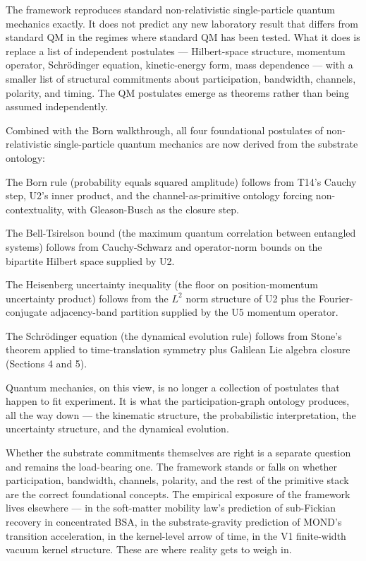 \documentclass[11pt,a4paper]{article}
\begin{document}
The framework reproduces standard non-relativistic single-particle quantum mechanics exactly. It does not predict any new laboratory result that differs from standard QM in the regimes where standard QM has been tested. What it does is replace a list of independent postulates --- Hilbert-space structure, momentum operator, Schr\"odinger equation, kinetic-energy form, mass dependence --- with a smaller list of structural commitments about participation, bandwidth, channels, polarity, and timing. The QM postulates emerge as theorems rather than being assumed independently.

Combined with the Born walkthrough, all four foundational postulates of non-relativistic single-particle quantum mechanics are now derived from the substrate ontology:

The Born rule (probability equals squared amplitude) follows from T14's Cauchy step, U2's inner product, and the channel-as-primitive ontology forcing non-contextuality, with Gleason-Busch as the closure step.

The Bell-Tsirelson bound (the maximum quantum correlation between entangled systems) follows from Cauchy-Schwarz and operator-norm bounds on the bipartite Hilbert space supplied by U2.

The Heisenberg uncertainty inequality (the floor on position-momentum uncertainty product) follows from the $L^2$ norm structure of U2 plus the Fourier-conjugate adjacency-band partition supplied by the U5 momentum operator.

The Schr\"odinger equation (the dynamical evolution rule) follows from Stone's theorem applied to time-translation symmetry plus Galilean Lie algebra closure (Sections 4 and 5).

Quantum mechanics, on this view, is no longer a collection of postulates that happen to fit experiment. It is what the participation-graph ontology produces, all the way down --- the kinematic structure, the probabilistic interpretation, the uncertainty structure, and the dynamical evolution.

Whether the substrate commitments themselves are right is a separate question and remains the load-bearing one. The framework stands or falls on whether participation, bandwidth, channels, polarity, and the rest of the primitive stack are the correct foundational concepts. The empirical exposure of the framework lives elsewhere --- in the soft-matter mobility law's prediction of sub-Fickian recovery in concentrated BSA, in the substrate-gravity prediction of MOND's transition acceleration, in the kernel-level arrow of time, in the V1 finite-width vacuum kernel structure. These are where reality gets to weigh in.
\end{document}

